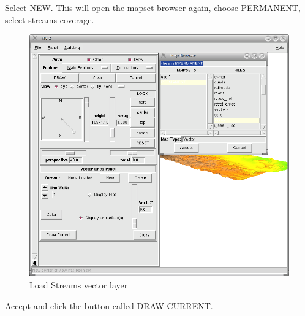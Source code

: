 Select NEW. This will open the mapset browser again, choose PERMANENT, select streams coverage.

\begin{figure}[htbp]
   \centering
   \includegraphics[scale=0.2]{nviz008.png}
   \caption{Load Streams vector layer}
   \label{fig:nviz008}
\end{figure}

Accept and click the button called DRAW CURRENT.

